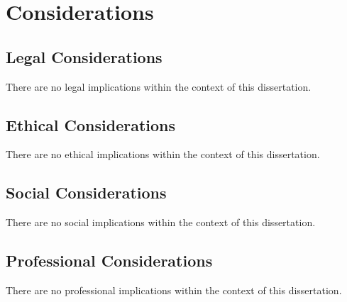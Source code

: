 
\chapter{Considerations}
\label{app:considerations}

\section{Legal Considerations}
\label{app:considerations:legal}

There are no legal implications within the context of this dissertation.
\par

\section{Ethical Considerations}
\label{app:considerations:ethical}

There are no ethical implications within the context of this dissertation.
\par

\section{Social Considerations}
\label{app:considerations:social}

There are no social implications within the context of this dissertation.
\par

\section{Professional Considerations}
\label{app:considerations:professional}

There are no professional implications within the context of this dissertation.
\par

